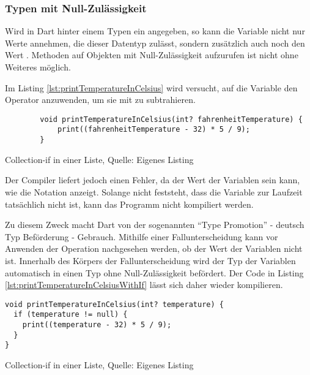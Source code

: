 \subsubsection{Typen mit Null-Zulässigkeit}
\label{TypenMitNullZulaessigkeit}

Wird in Dart hinter einem Typen ein  angegeben, so kann die Variable nicht nur  Werte annehmen, die dieser Datentyp zulässt, sondern zusätzlich auch noch den Wert .
Methoden auf Objekten mit Null-Zulässigkeit aufzurufen ist nicht ohne Weiteres möglich.

Im Listing \ref{lst:printTemperatureInCelsius}
wird versucht, auf die Variable  den Operator \IC{-} anzuwenden, um sie mit  zu subtrahieren.

\ifincludeall
  \begin{listing}[ht]
    \begin{verbatim}
        void printTemperatureInCelsius(int? fahrenheitTemperature) {
            print((fahrenheitTemperature - 32) * 5 / 9);
        }
\end{verbatim}
    \caption[Collection-if in einer Liste]{Collection-if in einer Liste, Quelle: Eigenes Listing}
    \label{lst:printTemperatureInCelsius}
  \end{listing}
\fi

Der Compiler liefert jedoch einen Fehler, da der Wert der Variablen  sein kann, wie die Notation  anzeigt.
Solange nicht feststeht, dass die Variable zur Laufzeit tatsächlich nicht  ist, kann das Programm nicht kompiliert werden.


Zu diesem Zweck macht Dart von der sogenannten \enquote{Type Promotion} - deutsch Typ Beförderung - Gebrauch.
Mithilfe einer Fallunterscheidung kann vor Anwenden der Operation nachgesehen werden, ob der Wert der Variablen nicht  ist.
Innerhalb des Körpers der Fallunterscheidung wird der Typ der Variablen automatisch in einen Typ ohne Null-Zulässigkeit befördert.
Der Code in Listing \ref{lst:printTemperatureInCelsiusWithIf} lässt sich daher wieder kompilieren.

\ifincludeall
  \begin{listing}[ht]
    \begin{verbatim}
void printTemperatureInCelsius(int? temperature) {
  if (temperature != null) {
    print((temperature - 32) * 5 / 9);
  }
}
\end{verbatim}
    \caption[Collection-if in einer Liste]{Collection-if in einer Liste, Quelle: Eigenes Listing}
    \label{lst:printTemperatureInCelsiusWithIf}
  \end{listing}
\fi

